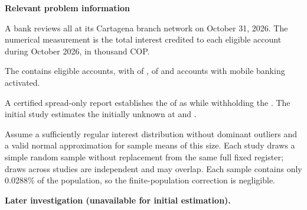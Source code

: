 \secInicio[][sec:p2]

\clearpage



\textbf{Relevant problem information}

\begin{probleminfoexcerpt}
A bank reviews all      at its Cartagena branch network on October 31, 2026. The numerical measurement is the total interest credited to each eligible account during October 2026, in thousand COP.
\end{probleminfoexcerpt}

\begin{probleminfoexcerpt}
The     contains  eligible accounts, with    of   ,    of    and  accounts with mobile banking activated.
\end{probleminfoexcerpt}

\begin{probleminfoexcerpt}
A certified spread-only report establishes the    of  as    while withholding the   . The initial study estimates the initially unknown    at  and  .
\end{probleminfoexcerpt}

\begin{probleminfoexcerpt}
Assume a sufficiently regular interest distribution without dominant outliers and a valid normal approximation for sample means of this size. Each study draws a simple random sample without replacement from the same full fixed register; draws across studies are independent and may overlap. Each sample contains only 0.0288\% of the population, so the finite-population correction is negligible.
\end{probleminfoexcerpt}

\textbf{Later investigation (unavailable for initial estimation).}

